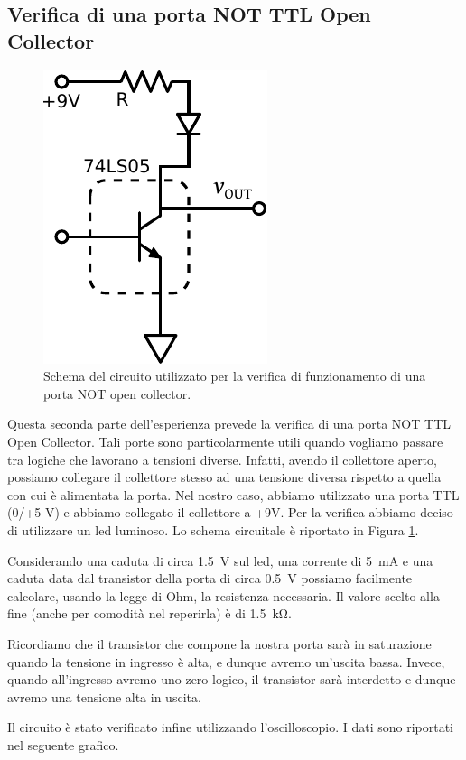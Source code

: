\subsection{Verifica di una porta NOT TTL Open Collector }

\begin{figure}
\centering
\includegraphics[width=.2\textwidth]{../E10/latex/open_collector.pdf}
\caption{Schema del circuito utilizzato per la verifica di funzionamento di una porta NOT open collector.}
\label{cir10:open_collector}
\end{figure}

Questa seconda parte dell'esperienza prevede la verifica di una porta NOT TTL Open Collector.
Tali porte sono particolarmente utili quando vogliamo passare tra logiche che lavorano a tensioni diverse.
Infatti, avendo il collettore aperto, possiamo collegare il collettore stesso ad una tensione diversa rispetto a quella con cui è alimentata la porta.
Nel nostro caso, abbiamo utilizzato una porta TTL (0/+5 \si{\volt}) e abbiamo collegato il collettore a +9\si{\volt}.
Per la verifica abbiamo deciso di utilizzare un led luminoso.
Lo schema circuitale è riportato in Figura \ref{cir10:open_collector}.

Considerando una caduta di circa \SI{1.5}{\volt} sul led, una corrente di \SI{5}{\milli\ampere} e una caduta data dal transistor della porta di circa \SI{0.5}{\volt} possiamo facilmente calcolare, usando la legge di Ohm, la resistenza necessaria. Il valore scelto alla fine (anche per comodità nel reperirla) è di \SI{1.5}{\kilo\ohm}.

Ricordiamo che il transistor che compone la nostra porta sarà in saturazione quando la tensione in ingresso è alta, e dunque avremo un'uscita bassa.
Invece, quando all'ingresso avremo uno zero logico, il transistor sarà interdetto e dunque avremo una tensione alta in uscita.

Il circuito è stato verificato infine utilizzando l'oscilloscopio.
I dati sono riportati nel seguente grafico.

